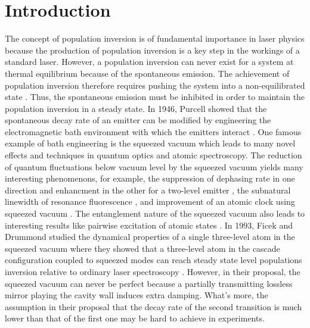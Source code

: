 \documentclass[aps,showpacs,twocolumn,twoside,groupedaddress]{revtex4}
\begin{document}
\section{Introduction}
The concept of population inversion is of fundamental importance in laser physics because the production of population inversion is a key step in the workings of a standard laser. However, a population inversion can never exist for a system at thermal equilibrium because of the spontaneous emission. The achievement of population inversion therefore requires pushing the system into a non-equilibrated state  \cite{svelto1998principles}. Thus, the spontaneous emission must be inhibited in order to maintain the population inversion in a steady state. In 1946, Purcell showed that the spontaneous decay rate of an emitter can be modified by engineering the electromagnetic bath environment with which the emitters interact \cite{purcell1946purcell}. One famous example of bath engineering is the squeezed vacuum which leads to many novel effects and techniques in quantum optics and atomic spectroscopy. The reduction of quantum fluctuations below vacuum level by the squeezed vacuum yields many interesting phenomenons, for example, the suppression of dephasing rate in one direction and enhancment in the other for a two-level emitter \cite{gardiner1986cw, collett1984mj,gea1988vacuum,palma1989gm, agarwal1990cooperative, ficek1990spontaneous,ficek1991z, goldstein1996ev}, the subnatural linewidth of resonance fluorescence \cite{carmichael1987, toyli2016resonance}, and improvement of an atomic clock using squeezed vacuum \cite{Kruse}. The entanglement nature of the squeezed vacuum also leads to interesting results like pairwise excitation of atomic states \cite{tanas2004stationary, li2006preparing, You2018}. In 1993, Ficek and Drummond studied the dynamical properties of a single three-level atom in the squeezed vacuum where they showed that a three-level atom in the cascade configuration coupled to squeezed modes can reach steady state level populations inversion relative to ordinary laser spectroscopy \cite{ficek1991three, ficek1991three2, ficek1993two}. However, in their proposal, the squeezed vacuum can never be perfect because a partially transmitting lossless mirror playing the cavity wall induces extra damping. What's more, the assumption in their proposal that the decay rate of the second transition is much lower than that of the first one may be hard to achieve in experiments.
\end{document}
